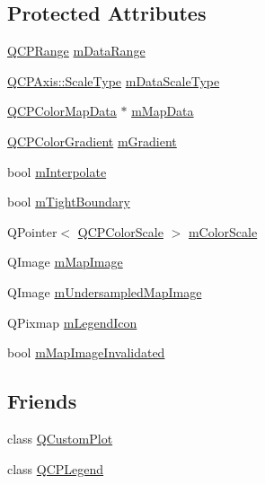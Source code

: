\subsection*{Protected Attributes}
\begin{DoxyCompactItemize}
\item 
\mbox{\hyperlink{class_q_c_p_range}{Q\+C\+P\+Range}} \mbox{\hyperlink{class_q_c_p_color_map_ab87609621d16cd3e9d52ad070b327b08}{m\+Data\+Range}}
\item 
\mbox{\hyperlink{class_q_c_p_axis_a36d8e8658dbaa179bf2aeb973db2d6f0}{Q\+C\+P\+Axis\+::\+Scale\+Type}} \mbox{\hyperlink{class_q_c_p_color_map_ab28a4b2def408f83b9818799d5f18446}{m\+Data\+Scale\+Type}}
\item 
\mbox{\hyperlink{class_q_c_p_color_map_data}{Q\+C\+P\+Color\+Map\+Data}} $\ast$ \mbox{\hyperlink{class_q_c_p_color_map_a8709272aa8f0be3ca111bf3866806f8b}{m\+Map\+Data}}
\item 
\mbox{\hyperlink{class_q_c_p_color_gradient}{Q\+C\+P\+Color\+Gradient}} \mbox{\hyperlink{class_q_c_p_color_map_aab77fe9a8df6f0486ab3507cc5f278fa}{m\+Gradient}}
\item 
bool \mbox{\hyperlink{class_q_c_p_color_map_af77e5eba9a844592648edeb6fbe834f1}{m\+Interpolate}}
\item 
bool \mbox{\hyperlink{class_q_c_p_color_map_ac2e9425fe4381b496726e1c09f978302}{m\+Tight\+Boundary}}
\item 
Q\+Pointer$<$ \mbox{\hyperlink{class_q_c_p_color_scale}{Q\+C\+P\+Color\+Scale}} $>$ \mbox{\hyperlink{class_q_c_p_color_map_a95b4100bacc3387652c988b071ec9db7}{m\+Color\+Scale}}
\item 
Q\+Image \mbox{\hyperlink{class_q_c_p_color_map_a66110813b42eca78b64095b2a1f285a0}{m\+Map\+Image}}
\item 
Q\+Image \mbox{\hyperlink{class_q_c_p_color_map_acad3d52f3572436d5f2e4057911ea8d3}{m\+Undersampled\+Map\+Image}}
\item 
Q\+Pixmap \mbox{\hyperlink{class_q_c_p_color_map_ada522988db02cb531767d38c5029ef60}{m\+Legend\+Icon}}
\item 
bool \mbox{\hyperlink{class_q_c_p_color_map_ac9aea6a5c193d7fa866bc7b26e79ef2c}{m\+Map\+Image\+Invalidated}}
\end{DoxyCompactItemize}
\subsection*{Friends}
\begin{DoxyCompactItemize}
\item 
class \mbox{\hyperlink{class_q_c_p_color_map_a1cdf9df76adcfae45261690aa0ca2198}{Q\+Custom\+Plot}}
\item 
class \mbox{\hyperlink{class_q_c_p_color_map_a8429035e7adfbd7f05805a6530ad5e3b}{Q\+C\+P\+Legend}}
\end{DoxyCompactItemize}


